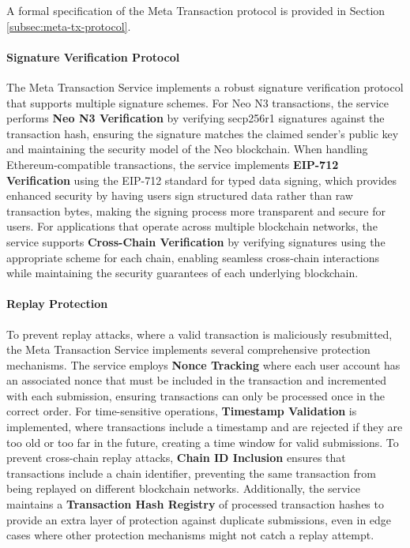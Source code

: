 \documentclass[12pt,a4paper]{article}
\begin{document}
A formal specification of the Meta Transaction protocol is provided in Section \ref{subsec:meta-tx-protocol}.



\paragraph{Signature Verification Protocol}
The Meta Transaction Service implements a robust signature verification protocol that supports multiple signature schemes. For Neo N3 transactions, the service performs \textbf{Neo N3 Verification} by verifying secp256r1 signatures against the transaction hash, ensuring the signature matches the claimed sender's public key and maintaining the security model of the Neo blockchain. When handling Ethereum-compatible transactions, the service implements \textbf{EIP-712 Verification} using the EIP-712 standard for typed data signing, which provides enhanced security by having users sign structured data rather than raw transaction bytes, making the signing process more transparent and secure for users. For applications that operate across multiple blockchain networks, the service supports \textbf{Cross-Chain Verification} by verifying signatures using the appropriate scheme for each chain, enabling seamless cross-chain interactions while maintaining the security guarantees of each underlying blockchain.

\paragraph{Replay Protection}
To prevent replay attacks, where a valid transaction is maliciously resubmitted, the Meta Transaction Service implements several comprehensive protection mechanisms. The service employs \textbf{Nonce Tracking} where each user account has an associated nonce that must be included in the transaction and incremented with each submission, ensuring transactions can only be processed once in the correct order. For time-sensitive operations, \textbf{Timestamp Validation} is implemented, where transactions include a timestamp and are rejected if they are too old or too far in the future, creating a time window for valid submissions. To prevent cross-chain replay attacks, \textbf{Chain ID Inclusion} ensures that transactions include a chain identifier, preventing the same transaction from being replayed on different blockchain networks. Additionally, the service maintains a \textbf{Transaction Hash Registry} of processed transaction hashes to provide an extra layer of protection against duplicate submissions, even in edge cases where other protection mechanisms might not catch a replay attempt.
\end{document}
